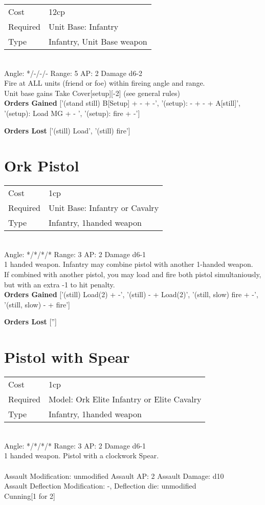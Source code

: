 \begin{tabular}{ll}
    Cost & 12cp \\
    Required & Unit Base: Infantry\\
    Type & Infantry, Unit Base weapon\\
\end{tabular}
\ \\
\indent Angle: */-/-/- Range: 5  AP: 2 Damage d6-2 \\
Fire at ALL units (friend or foe) within fireing angle and range.\\ Unit base gains Take Cover[setup][-2] (see general rules)
\ \\

{\bf Orders Gained}
['(stand still) B[Setup] + - + -', '(setup): - + - + A[still]', '(setup): Load MG + - ', '(setup): fire + -']

{\bf Orders Lost}
['(still) Load', '(still) fire']
\section{ Ork Pistol }

\begin{tabular}{ll}
    Cost & 1cp \\
    Required & Unit Base: Infantry or Cavalry\\
    Type & Infantry, 1handed weapon\\
\end{tabular}
\ \\
\indent Angle: */*/*/* Range: 3  AP: 2 Damage d6-1 \\
1 handed weapon. Infantry may combine pistol with another 1-handed weapon. \\ If combined with another pistol, you may load and fire both pistol simultaniously, but with an extra -1 to hit penalty.
\ \\

{\bf Orders Gained}
['(still) Load(2) + -', '(still) - + Load(2)', '(still, slow) fire + -', '(still, slow) - + fire']

{\bf Orders Lost}
['']
\section{ Pistol with Spear }

\begin{tabular}{ll}
    Cost & 1cp \\
    Required & Model: Ork Elite Infantry or Elite Cavalry\\
    Type & Infantry, 1handed weapon\\
\end{tabular}
\ \\
\indent Angle: */*/*/* Range: 3  AP: 2 Damage d6-1 \\
1 handed weapon. Pistol with a clockwork Spear. \\
\ \\
Assault Modification: unmodified Assault AP: 2 Assault Damage: d10\\
Assault Deflection Modification: -, Deflection die: unmodified \\
Cunning[1 for 2]

